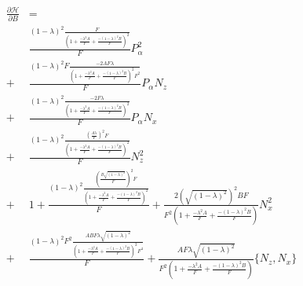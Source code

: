 \documentclass{article}
\begin{document}
\begin{align*}
	\frac{\partial \mathscr{H}}{\partial B} &= \\
	& \frac{\left( 1 - \lambda \right)^{2} \frac{F}{\left( 1 + \frac{ - \lambda^{2} A}{F} + \frac{ - \left( 1 - \lambda \right)^{2} B}{F} \right)^{2}}}{F} P_{\alpha}^{2} \\
	+& \frac{\left( 1 - \lambda \right)^{2} F \frac{ - 2 A F \lambda}{\left( 1 + \frac{ - \lambda^{2} A}{F} + \frac{ - \left( 1 - \lambda \right)^{2} B}{F} \right)^{2} F^{2}}}{F} P_{\alpha}N_{z} \\
	+& \frac{\left( 1 - \lambda \right)^{2} \frac{ - 2 F \lambda}{\left( 1 + \frac{ - \lambda^{2} A}{F} + \frac{ - \left( 1 - \lambda \right)^{2} B}{F} \right)^{2}}}{F} P_{\alpha}N_{x} \\
	+& \frac{\left( 1 - \lambda \right)^{2} \frac{\left( \frac{A \lambda}{F} \right)^{2} F}{\left( 1 + \frac{ - \lambda^{2} A}{F} + \frac{ - \left( 1 - \lambda \right)^{2} B}{F} \right)^{2}}}{F} N_{z}^{2} \\
	+& 1 + \frac{\left( 1 - \lambda \right)^{2} \frac{\left( \frac{B \sqrt{\left( 1 - \lambda \right)^{2}}}{F} \right)^{2} F}{\left( 1 + \frac{ - \lambda^{2} A}{F} + \frac{ - \left( 1 - \lambda \right)^{2} B}{F} \right)^{2}}}{F} + \frac{2 \left( \sqrt{\left( 1 - \lambda \right)^{2}} \right)^{2} B F}{F^{2} \left( 1 + \frac{ - \lambda^{2} A}{F} + \frac{ - \left( 1 - \lambda \right)^{2} B}{F} \right)} N_{x}^{2} \\
	+& \frac{\left( 1 - \lambda \right)^{2} F^{2} \frac{A B F \lambda \sqrt{\left( 1 - \lambda \right)^{2}}}{\left( 1 + \frac{ - \lambda^{2} A}{F} + \frac{ - \left( 1 - \lambda \right)^{2} B}{F} \right)^{2} F^{4}}}{F} + \frac{A F \lambda \sqrt{\left( 1 - \lambda \right)^{2}}}{F^{2} \left( 1 + \frac{ - \lambda^{2} A}{F} + \frac{ - \left( 1 - \lambda \right)^{2} B}{F} \right)} \{N_{z},N_{x}\}
\end{align*}
\end{document}
